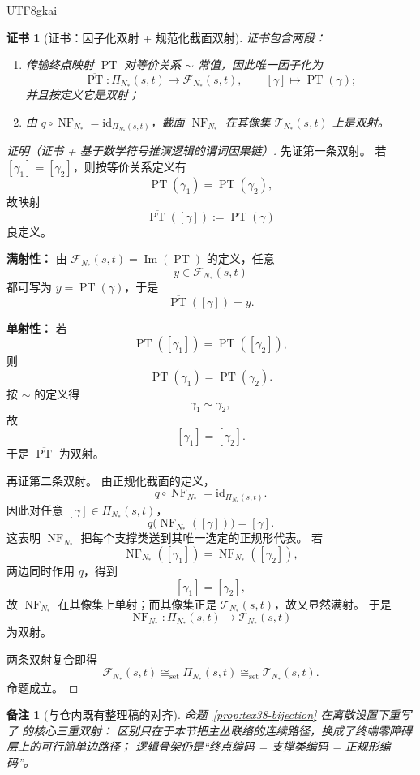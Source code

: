 \documentclass[12pt]{article}
\newtheorem{remark}{备注}[section]
\newtheorem{Certificate}{证书}[section]
\newcommand{\NF}{\operatorname{NF}}
\newcommand{\PT}{\operatorname{PT}}
\newcommand{\id}{\mathrm{id}}
\begin{document}
\begin{CJK*}{UTF8}{gkai}
\begin{Certificate}[证书：因子化双射 + 规范化截面双射]
\label{cert:tex38-bijection}
证书包含两段：
\begin{enumerate}
  \item 传输终点映射 $\PT$ 对等价关系 $\sim$ 常值，因此唯一因子化为
  \[
    \overline{\PT}:\Pi_{N_\ast}(s,t)\to \mathcal{F}_{N_\ast}(s,t),
    \qquad
    [\gamma]\mapsto \PT(\gamma);
  \]
  并且按定义它是双射；
  \item 由 $q\circ \NF_{N_\ast}=\id_{\Pi_{N_\ast}(s,t)}$，截面 $\NF_{N_\ast}$ 在其像集
  $\mathcal{T}_{N_\ast}(s,t)$ 上是双射。
\end{enumerate}
\end{Certificate}

\begin{proof}[证明（证书 + 基于数学符号推演逻辑的谓词因果链）]
先证第一条双射。
若 $[\gamma_1]=[\gamma_2]$，则按等价关系定义有
\[
  \PT(\gamma_1)=\PT(\gamma_2),
\]
故映射
\[
  \overline{\PT}([\gamma]):=\PT(\gamma)
\]
良定义。

\textbf{满射性：}
由 $\mathcal{F}_{N_\ast}(s,t)=\operatorname{Im}(\PT)$ 的定义，任意
\[
  y\in \mathcal{F}_{N_\ast}(s,t)
\]
都可写为 $y=\PT(\gamma)$，于是
\[
  \overline{\PT}([\gamma])=y.
\]

\textbf{单射性：}
若
\[
  \overline{\PT}([\gamma_1])=\overline{\PT}([\gamma_2]),
\]
则
\[
  \PT(\gamma_1)=\PT(\gamma_2).
\]
按 $\sim$ 的定义得
\[
  \gamma_1\sim\gamma_2,
\]
故
\[
  [\gamma_1]=[\gamma_2].
\]
于是 $\overline{\PT}$ 为双射。

再证第二条双射。
由正规化截面的定义，
\[
  q\circ \NF_{N_\ast}
  =
  \id_{\Pi_{N_\ast}(s,t)}.
\]
因此对任意 $[\gamma]\in \Pi_{N_\ast}(s,t)$，
\[
  q\bigl(\NF_{N_\ast}([\gamma])\bigr)=[\gamma].
\]
这表明 $\NF_{N_\ast}$ 把每个支撑类送到其唯一选定的正规形代表。
若
\[
  \NF_{N_\ast}([\gamma_1])=\NF_{N_\ast}([\gamma_2]),
\]
两边同时作用 $q$，得到
\[
  [\gamma_1]=[\gamma_2],
\]
故 $\NF_{N_\ast}$ 在其像集上单射；而其像集正是 $\mathcal{T}_{N_\ast}(s,t)$，故又显然满射。
于是
\[
  \NF_{N_\ast}:\Pi_{N_\ast}(s,t)\to \mathcal{T}_{N_\ast}(s,t)
\]
为双射。

两条双射复合即得
\[
  \mathcal{F}_{N_\ast}(s,t)
  \cong_{\mathrm{set}}
  \Pi_{N_\ast}(s,t)
  \cong_{\mathrm{set}}
  \mathcal{T}_{N_\ast}(s,t).
\]
命题成立。
\end{proof}

\begin{remark}[与仓内既有整理稿的对齐]
命题~\ref{prop:tex38-bijection} 在离散设置下重写了 \cite{RepoTex36HomotopyTwistBijection} 的核心三重双射：
区别只在于本节把主丛联络的连续路径，换成了终端零障碍层上的可行简单边路径；
逻辑骨架仍是“终点编码 = 支撑类编码 = 正规形编码”。
\end{remark}


\end{CJK*}
\end{document}
